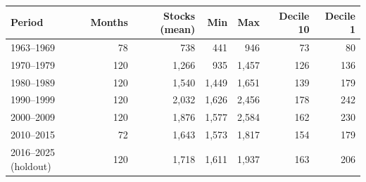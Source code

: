 \begin{tabular}{lrrrrrr}
\toprule
Period & Months & Stocks (mean) & Min & Max & Decile 10 & Decile 1 \\
\midrule
1963--1969 & 78 & 738 & 441 & 946 & 73 & 80 \\
1970--1979 & 120 & 1,266 & 935 & 1,457 & 126 & 136 \\
1980--1989 & 120 & 1,540 & 1,449 & 1,651 & 139 & 179 \\
1990--1999 & 120 & 2,032 & 1,626 & 2,456 & 178 & 242 \\
2000--2009 & 120 & 1,876 & 1,577 & 2,584 & 162 & 230 \\
2010--2015 & 72 & 1,643 & 1,573 & 1,817 & 154 & 179 \\
2016--2025 (holdout) & 120 & 1,718 & 1,611 & 1,937 & 163 & 206 \\
\bottomrule
\end{tabular}

